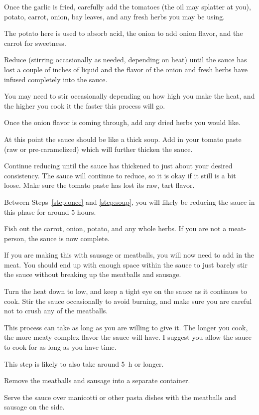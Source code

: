 \begin{recipe}
{		\step Once the garlic is fried, carefully add the tomatoes (the oil may splatter at you), potato, carrot, onion, bay leaves, and any fresh herbs you may be using.

		The potato here is used to absorb acid, the onion to add onion flavor, and the carrot for sweetness.

		\step Reduce (stirring occasionally as needed, depending on heat) until the sauce has lost a couple of inches of liquid and the flavor of the onion and fresh herbs have infused completely into the sauce.

		You may need to stir occasionally depending on how high you make the heat, and the higher you cook it the faster this process will go.

		\step \label{step:once}Once the onion flavor is coming through, add any dried herbs you would like.

		\vspace{1em}

		\step \label{step:soup} At this point the sauce should be like a thick soup. Add in your tomato paste (raw or pre-caramelized) which will further thicken the sauce.

		Continue reducing until the sauce has thickened to just about your desired consistency. The sauce will continue to reduce, so it is okay if it still is a bit loose. Make sure the tomato paste has lost its raw, tart flavor.

		Between Steps~\ref{step:once} and \ref{step:soup}, you will likely be reducing the sauce in this phase for around 5 hours.

		\step Fish out the carrot, onion, potato, and any whole herbs. If you are not a meat-person, the sauce is now complete.

		\step If you are making this with sausage or meatballs, you will now need to add in the meat. You should end up with enough space within the sauce to just barely stir the sauce without breaking up the meatballs and sausage.

		Turn the heat down to low, and keep a tight eye on the sauce as it continues to cook. Stir the sauce occasionally to avoid burning, and make sure you are careful not to crush any of the meatballs.

		This process can take as long as you are willing to give it. The longer you cook, the more meaty complex flavor the sauce will have. I suggest you allow the sauce to cook for as long as you have time.

		This step is likely to also take around \SI{5}{\hour} or longer.

		\step Remove the meatballs and sausage into a separate container.

		\vspace{1em}

		Serve the sauce over manicotti or other pasta dishes with the meatballs and sausage on the side.

	}

\end{recipe}